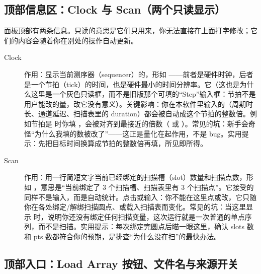 \documentclass[11pt,oneside,openany]{book}
\begin{document}
\subsection{顶部信息区：Clock 与 Scan（两个只读显示）}

面板顶部有两条信息。只读的意思是它们只用来，你无法直接在上面打字修改；它们的内容会随着你在别处的操作自动更新。

\begin{description}
\item[Clock] 作用：显示当前测序器（sequencer）的，形如 ——前者是硬件时钟，后者是一个节拍（tick）的时间，也是硬件最小的时间分辨率。它（这也是为什么这里是一个灰色只读框，而不是旧版那个可填的“Step”输入框：节拍不是用户能改的量，改它没有意义）。关键影响：你在本软件里输入的（周期时长、通道延迟、扫描表里的 duration）都会被自动成这个节拍的整数倍。例如节拍是  时你填 ，会被对齐到最接近的倍数（ 或 ）。常见的坑：新手会奇怪“为什么我填的数被改了”——这正是量化在起作用，不是 bug。实用提示：先把目标时间换算成节拍的整数倍再填，所见即所得。

\item[Scan] 作用：用一行简短文字当前已经绑定的扫描槽（slot）数量和扫描点数，形如 ，意思是“当前绑定了 3 个扫描槽、扫描表里有 3 个扫描点”。它接受的同样不是输入，而是自动统计。点击或输入：你不能在这里点或改，它只随你在各处绑定/解绑扫描圆点、或载入扫描表而变化。常见的坑：当这里显示  时，说明你还没有绑定任何扫描变量，这次运行就是一次普通的单点序列，而不是扫描。实用提示：每次绑定完圆点后瞄一眼这里，确认 slots 数和 pts 数都符合你的预期，是排查“为什么没在扫”的最快办法。
\end{description}

\subsection{顶部入口：Load Array 按钮、文件名与来源开关}
\end{document}
